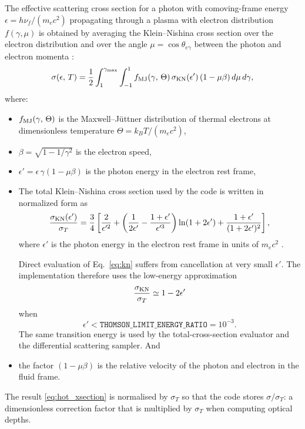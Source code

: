 \documentclass[12pt,a4paper]{article}
\newcommand{\code}[1]{\texttt{#1}}
\begin{document}
The effective scattering cross section for a photon with comoving-frame
energy $\epsilon = h\nu_f / (m_e c^2)$ propagating through a plasma with
electron distribution $f(\gamma, \mu)$ is obtained by averaging the
Klein--Nishina cross section over the electron distribution and over the
angle $\mu = \cos\theta_{e\gamma}$ between the photon and electron momenta
\citep{dolence2009,kawashima2023,canfield1987}:
\begin{equation}
	\sigma(\epsilon,\,T) =
	\frac{1}{2}
	\int_1^{\gamma_{\max}} \int_{-1}^{1}
	f_{\rm MJ}(\gamma,\,\Theta)\,
	\sigma_{\rm KN}(\epsilon')\,
	(1 - \mu\beta)\,
	d\mu\, d\gamma,
	\label{eq:hot_xsection}
\end{equation}
where:
\begin{itemize}
	\item $f_{\rm MJ}(\gamma,\,\Theta)$ is the Maxwell--J\"{u}ttner
	distribution of thermal electrons at dimensionless temperature
	$\Theta = k_B T / (m_e c^2)$,
	\item $\beta = \sqrt{1 - 1/\gamma^2}$ is the electron speed,
	\item $\epsilon' = \epsilon\,\gamma(1 - \mu\beta)$ is the photon energy
	in the electron rest frame,
	\item The total Klein--Nishina cross section used by the code is written in
	normalized form as
	\begin{equation}
		\frac{\sigma_{\rm KN}(\epsilon')}{\sigma_T}
		=
		\frac{3}{4}
		\left[
		\frac{2}{\epsilon'^2}
		+
		\left(
		\frac{1}{2\epsilon'}
		-
		\frac{1+\epsilon'}{\epsilon'^3}
		\right)
		\ln(1+2\epsilon')
		+
		\frac{1+\epsilon'}{(1+2\epsilon')^2}
		\right],
		\label{eq:kn}
	\end{equation}
	where $\epsilon'$ is the photon energy in the electron rest frame in
	units of $m_ec^2$ \citep{dolence2009}.
	
	Direct evaluation of Eq.~\eqref{eq:kn} suffers from cancellation at very
	small $\epsilon'$. The implementation therefore uses the low-energy
	approximation
	\begin{equation}
		\frac{\sigma_{\rm KN}}{\sigma_T}
		\simeq
		1-2\epsilon'
	\end{equation}
	when
	\begin{equation}
		\epsilon'
		<
		\code{THOMSON\_LIMIT\_ENERGY\_RATIO}
		=
		10^{-3}.
	\end{equation}
	The same transition energy is used by the total-cross-section evaluator
	and the differential scattering sampler. And
	\item the factor $(1-\mu\beta)$ is the relative velocity of the photon
	and electron in the fluid frame.
\end{itemize}
The result \eqref{eq:hot_xsection} is normalised by $\sigma_T$ so that the
code stores $\sigma/\sigma_T$: a dimensionless correction factor that is
multiplied by $\sigma_T$ when computing optical depths.
\end{document}
